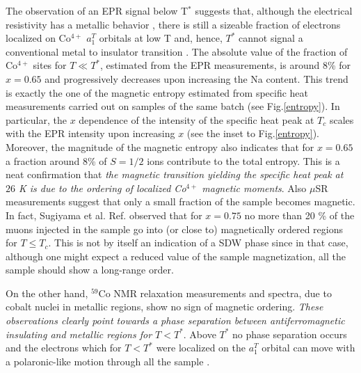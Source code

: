 \documentclass[prb,showpacs,preprintnumbers,amsmath,amssymb,floatfix]{revtex4}
\begin{document}
The observation of an EPR signal below T$^*$ suggests that,
although the electrical resistivity has a metallic behavior
\cite{Batlogg}, there is still a sizeable fraction of electrons
localized on Co$^{4+}$ $a_1^T$ orbitals at low T and, hence, $T^*$
cannot signal a conventional metal to insulator transition
\cite{Good}. The absolute value of the fraction of Co$^{4+}$ sites
for $T\ll T^*$, estimated from the EPR measurements, is around 8\%
for $x=0.65$ and progressively decreases upon increasing the Na
content. This trend is exactly the one of the magnetic entropy
estimated from specific heat measurements carried out on samples
of the same batch \cite{Feher} (see Fig.\ref{entropy}). In
particular, the $x$ dependence of the intensity of the specific
heat peak at $T_c$ scales with the EPR intensity upon increasing
$x$ (see the inset to Fig.\ref{entropy}). Moreover, the magnitude
of the magnetic entropy \cite{Feher} also indicates that for
$x=0.65$ a fraction around 8\% of $S=1/2$ ions contribute to the
total entropy. This is a neat confirmation that {\it the magnetic
transition yielding the specific heat peak at $26$ K is due to the
ordering of localized Co$^{4+}$ magnetic moments}. Also $\mu$SR
measurements suggest that only a small fraction of the sample
becomes magnetic. In fact, Sugiyama et al. Ref.
observed that for $x=0.75$ no more than 20 \% of the muons
injected in the sample go into (or close to) magnetically ordered
regions for $T\leq T_c$. This is not by itself an indication of a
SDW phase since in that case, although one might expect a reduced
value of the sample magnetization, all the sample should show a
long-range order.

On the other hand, $^{59}$Co NMR relaxation measurements and
spectra, due to cobalt nuclei in metallic regions, show no sign of
magnetic ordering. {\it These observations clearly point towards a
phase separation between antiferromagnetic insulating and metallic
regions for $T<T^*$}. Above $T^*$ no phase separation occurs and
the electrons which for $T<T^*$ were localized  on the $a_1^T$
orbital can move with a polaronic-like motion through all the
sample \cite{Good}.
\end{document}
